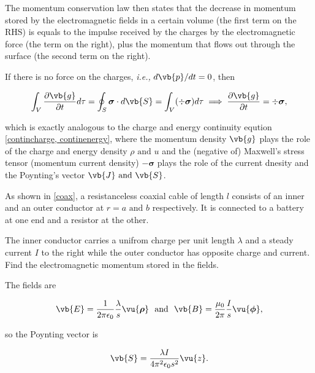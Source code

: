 \documentclass[english,a4paper,12pt]{report}
\begin{document}
The momentum conservation law then states that the decrease in momentum stored by the electromagnetic fields in a certain volume (the first term on the RHS) is equals to the impulse received by the charges by the electromagnetic force (the term on the right), plus the momentum that flows out through the surface (the second term on the right).

If there is no force on the charges, \textit{i.e.,} \(d\vb{p} /dt = 0\), then 

\begin{equation}
    \int_{V}^{} \frac{\partial \vb{g} }{\partial t} d\tau = \oint_{S} \boldsymbol{\sigma } \cdot d\vb{S} = \int_{V}^{} (\div{\boldsymbol{\sigma } } ) d\tau \implies \frac{\partial \vb{g} }{\partial t} = \div{\boldsymbol{\sigma } },  \label{continmomentum} 
\end{equation}

which is exactly analogous to the charge and energy continuity eqution \cref{contincharge, continenergy}, where the momentum density \(\vb{g} \) plays the role of the charge and energy density \(\rho \text { and } u\) and the (negative of) Maxwell's stress tensor (momentum current density) \(-\boldsymbol{\sigma } \) plays the role of the current dnesity and the Poynting's vector \(\vb{J} \text { and } \vb{S} \).     

{As shown in \cref{coax}, a resistanceless coaxial cable of length \(l\) consists of an inner and an outer conductor at \(r = a \text { and } b\) respectively. It is connected to a battery at one end and a resistor at the other. 

The inner conductor carries a unifrom charge per unit length \(\lambda \) and a steady current \(I\) to the right while the outer conductor has opposite charge and current. Find the electromagnetic momentum stored in the fields.}
{The fields are 

\begin{equation}
    \vb{E} = \frac{1}{2\pi \epsilon_0 } \frac{\lambda }{s} \vu{\boldsymbol{\rho }} ~\text { and }~ \vb{B} = \frac{\mu_0 }{2\pi } \frac{I}{s} \vu{\boldsymbol{\phi }},      
\end{equation}

so the Poynting vector is 

\begin{equation}
    \vb{S} = \frac{\lambda I}{4\pi ^2\epsilon_0 s ^2}\vu{z}. 
\end{equation}


} 
\end{document}
